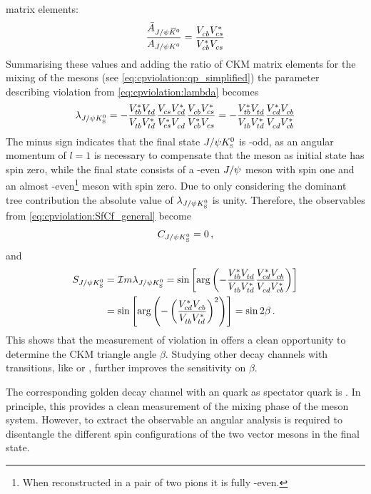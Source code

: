 matrix elements:
\begin{align}
	\frac{\bar{A}_{J/\psi{\ensuremath{{\kern 0.2em\overline{\kern -0.2em K}{}}{}^0}}}}{A_{J/\psi{\ensuremath{{K}^0}}}} = \frac{{V_{{c}{b}}^{}}{V_{{c}{s}}^\ast}}{{V_{{c}{b}}^\ast}{V_{{c}{s}}^{}}}
\end{align}
Summarising these values and adding the ratio of CKM matrix elements for the
mixing of the \Bd mesons (see \cref{eq:cpviolation:qp_simplified}) the
parameter describing \CP violation from \cref{eq:cpviolation:lambda} becomes
\begin{align}
	\lambda_{J/\psi{\ensuremath{{K}^0_{\mathrm{ \scriptscriptstyle S}}}}} = - \frac{{V_{{t}{b}}^\ast}{V_{{t}{d}}^{}}}{{V_{{t}{b}}^{}}{V_{{t}{d}}^\ast}}\frac{{V_{{c}{s}}^{}}{V_{{c}{d}}^\ast}}{{V_{{c}{s}}^\ast}{V_{{c}{d}}^{}}}\frac{{V_{{c}{b}}^{}}{V_{{c}{s}}^\ast}}{{V_{{c}{b}}^\ast}{V_{{c}{s}}^{}}} = - \frac{{V_{{t}{b}}^\ast}{V_{{t}{d}}^{}}}{{V_{{t}{b}}^{}}{V_{{t}{d}}^\ast}}\frac{{V_{{c}{d}}^\ast}{V_{{c}{b}}^{}}}{{V_{{c}{d}}^{}}{V_{{c}{b}}^\ast}}
\label{eq:lambda_JPsiKS}
\end{align}
The minus sign indicates that the final state $J/\psi{\ensuremath{{K}^0_{\mathrm{ \scriptscriptstyle S}}}}$ is \CP-odd, as an
angular momentum of $l = 1$ is necessary to compensate that the \Bd meson as
initial state has spin zero, while the final state consists of a \CP-even
$J/\psi$ meson with spin one and an almost \CP-even\footnote{When reconstructed
in a pair of two pions it is fully \CP-even.} \KS meson with spin zero. Due to
only considering the dominant tree contribution the absolute value of
$\lambda_{J/\psi{\ensuremath{{K}^0_{\mathrm{ \scriptscriptstyle S}}}}}$ is unity. Therefore, the \CP observables from
\cref{eq:cpviolation:SfCf_general} become
\begin{align}
	C_{J/\psi{\ensuremath{{K}^0_{\mathrm{ \scriptscriptstyle S}}}}} = 0\,,
\end{align}
and
\begin{align}
	S_{J/\psi{\ensuremath{{K}^0_{\mathrm{ \scriptscriptstyle S}}}}} &= \mathcal{I}m\lambda_{J/\psi{\ensuremath{{K}^0_{\mathrm{ \scriptscriptstyle S}}}}}
			 = \sin\left[\text{arg}\left(-\frac{{V_{{t}{b}}^\ast}{V_{{t}{d}}^{}}}{{V_{{t}{b}}^{}}{V_{{t}{d}}^\ast}}\frac{{V_{{c}{d}}^\ast}{V_{{c}{b}}^{}}}{{V_{{c}{d}}^{}}{V_{{c}{b}}^\ast}}\right)\right]\\
			 &= \sin\left[\text{arg}\left(-\left(\frac{{V_{{c}{d}}^\ast}{V_{{c}{b}}^{}}}{{V_{{t}{b}}^{}}{V_{{t}{d}}^\ast}}\right)^2\right)\right]
			 = \sin 2\beta\,.
\end{align}
This shows that the measurement of \CP violation in \BdToJPsiKS offers a clean
opportunity to determine the CKM triangle angle $\beta$. Studying other decay
channels with \bToccbars transitions, like \BdToJPsiKL or \BdToPsiTwoSKS,
further improves the sensitivity on $\beta$.

The corresponding golden decay channel with an \squark quark as spectator
quark is \myBsToJPsiPhi. In principle, this provides a clean measurement of
the mixing phase \phis of the \Bs meson system. However, to extract the \CP
observable an angular analysis is required to disentangle the
different spin configurations of the two vector mesons in the final state.
